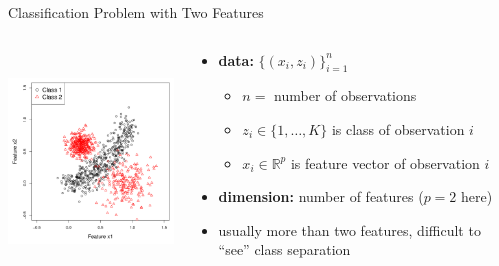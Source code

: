 \documentclass[12pt]{beamer}
\begin{document}
\begin{frame}{Classification Problem with Two Features}
\begin{columns}[T] %

\begin{column}{.5\textwidth}
\includegraphics[height=2.3in,width=2.3in]{figs/training.pdf}
\end{column}
\begin{column}{.5\textwidth}
  \begin{itemize}
  \item \textbf{data:} $\{(x_i,z_i)\}_{i=1}^n$
    \begin{itemize}
    \item $n = $ number of observations
    \item $z_i \in \{1,\ldots,K\}$ is class of observation $i$
    \item $x_i \in \mathbb{R}^p$ is feature vector of observation $i$
    \end{itemize}
  \item \textbf{dimension:} number of features ($p=2$ here)
  \item usually more than two features, difficult to ``see'' class separation
  \end{itemize}
\end{column}

\end{columns}

\end{frame}
\end{document}
